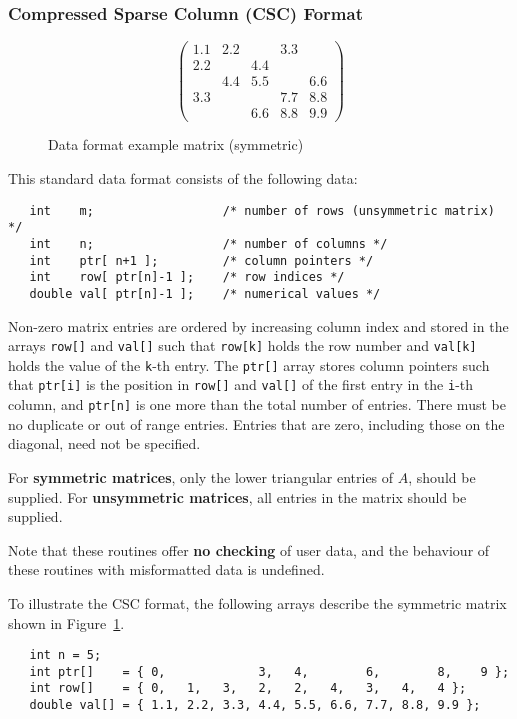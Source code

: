 \subsubsection{Compressed Sparse Column (CSC) Format} \label{cscformat}

\begin{figure}
   \caption{ \label{format eg}
      Data format example matrix (symmetric)
   }
   $$
      \left( \begin{array}{ccccc}
         1.1 & 2.2 &     & 3.3 &     \\
         2.2 &     & 4.4 &     &     \\
             & 4.4 & 5.5 &     & 6.6 \\
         3.3 &     &     & 7.7 & 8.8 \\
             &     & 6.6 & 8.8 & 9.9
      \end{array} \right)
   $$
\end{figure}

This standard data format consists of the following data:
\begin{verbatim}
   int    m;                  /* number of rows (unsymmetric matrix) */
   int    n;                  /* number of columns */
   int    ptr[ n+1 ];         /* column pointers */
   int    row[ ptr[n]-1 ];    /* row indices */
   double val[ ptr[n]-1 ];    /* numerical values */
\end{verbatim}
Non-zero matrix entries are ordered by increasing column index and stored in
the arrays \texttt{row[]} and \texttt{val[]} such that \texttt{row[k]} holds
the row number and \texttt{val[k]} holds the value of the \texttt{k}-th entry.
The \texttt{ptr[]} array stores column pointers such that \texttt{ptr[i]} is
the position in \texttt{row[]} and \texttt{val[]} of
the first entry in the \texttt{i}-th column, and \texttt{ptr[n]} is one more
than the total number of entries. There must be no duplicate or out of range
entries.
Entries that are zero, including those on the diagonal, need not be specified.

For \textbf{symmetric matrices}, only the lower triangular entries of $A$,
should be supplied. For \textbf{unsymmetric matrices}, all entries in the matrix
should be supplied.

Note that these routines offer \textbf{no checking} of user data, and the
behaviour of these routines with misformatted data is undefined.

To illustrate the CSC format, the following arrays describe the symmetric
matrix shown in Figure~\ref{format eg}.
\begin{verbatim}
   int n = 5;
   int ptr[]    = { 0,             3,   4,        6,        8,    9 };
   int row[]    = { 0,   1,   3,   2,   2,   4,   3,   4,   4 };
   double val[] = { 1.1, 2.2, 3.3, 4.4, 5.5, 6.6, 7.7, 8.8, 9.9 };
\end{verbatim}

